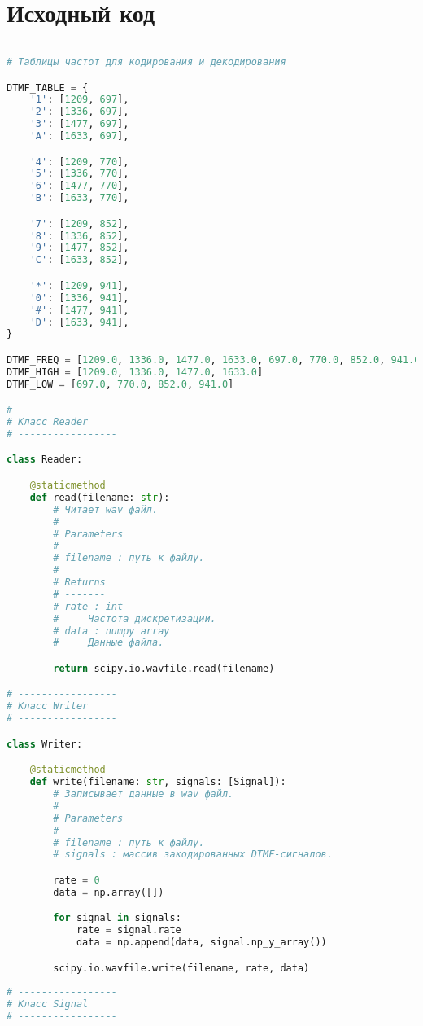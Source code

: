\chapter{Исходный код}\label{SkinCancerClassifier}

\begin{lstlisting}[language=python]
	
# Таблицы частот для кодирования и декодирования

DTMF_TABLE = {
    '1': [1209, 697],
    '2': [1336, 697],
    '3': [1477, 697],
    'A': [1633, 697],

    '4': [1209, 770],
    '5': [1336, 770],
    '6': [1477, 770],
    'B': [1633, 770],

    '7': [1209, 852],
    '8': [1336, 852],
    '9': [1477, 852],
    'C': [1633, 852],

    '*': [1209, 941],
    '0': [1336, 941],
    '#': [1477, 941],
    'D': [1633, 941],
}

DTMF_FREQ = [1209.0, 1336.0, 1477.0, 1633.0, 697.0, 770.0, 852.0, 941.0]
DTMF_HIGH = [1209.0, 1336.0, 1477.0, 1633.0]
DTMF_LOW = [697.0, 770.0, 852.0, 941.0]

# -----------------
# Класс Reader
# -----------------

class Reader:

    @staticmethod
    def read(filename: str):
        # Читает wav файл.
        #
        # Parameters
        # ----------
        # filename : путь к файлу.
        #
        # Returns
        # -------
        # rate : int
        #     Частота дискретизации.
        # data : numpy array
        #     Данные файла.

        return scipy.io.wavfile.read(filename)

# -----------------
# Класс Writer
# -----------------

class Writer:

    @staticmethod
    def write(filename: str, signals: [Signal]):
        # Записывает данные в wav файл.
        #
        # Parameters
        # ----------
        # filename : путь к файлу.
        # signals : массив закодированных DTMF-сигналов.

        rate = 0
        data = np.array([])

        for signal in signals:
            rate = signal.rate
            data = np.append(data, signal.np_y_array())

        scipy.io.wavfile.write(filename, rate, data)
        
# -----------------
# Класс Signal
# -----------------
    

\end{lstlisting}
